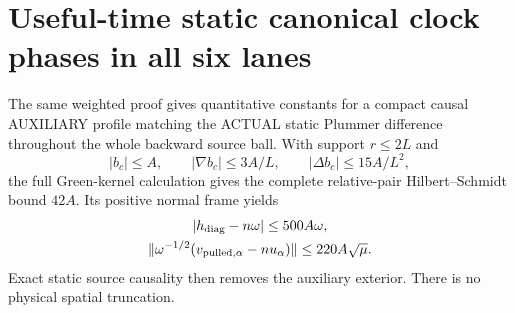 \section{Useful-time static canonical clock phases in all six lanes}
The same weighted proof gives quantitative constants for a compact causal
AUXILIARY profile matching the ACTUAL static Plummer difference throughout
the whole backward source ball. With support $r\le2L$ and
\[
 |b_c|\le A,\qquad |\nabla b_c|\le3A/L,\qquad
 |\Delta b_c|\le15A/L^2,
\]
the full Green-kernel calculation gives the complete relative-pair
Hilbert--Schmidt bound $42A$. Its positive normal frame yields
\[
 \begin{gathered}
 |h_{\rm diag}-n\omega|\le500A\omega,\\
 \|\omega^{-1/2}(v_{\rm pulled,\alpha}-nu_\alpha)\|
                                      \le220A\sqrt\mu.
 \end{gathered}
\]
Exact static source causality then removes the auxiliary exterior.
There is no physical spatial truncation.

